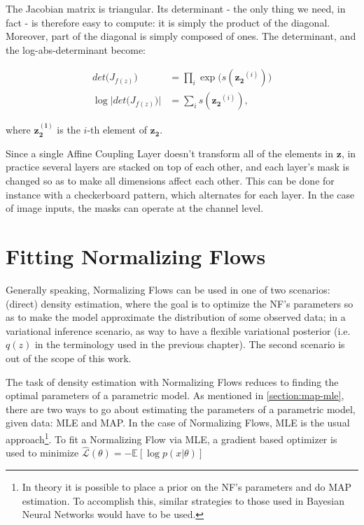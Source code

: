 The Jacobian matrix is triangular. Its determinant - the only thing we need,
in fact - is therefore easy to compute: it is simply the product of the diagonal.
Moreover, part of the diagonal is simply composed of ones. The determinant, and
the log-abs-determinant become:

\begin{align}
    det\big(J_{f(z)}\big) &= \prod_i \exp\big(s(\mathbf{z_2}^{(i)})\big) \\
    \log \Big|det\big(J_{f(z)}\big)\Big| &= \sum_i s(\mathbf{z_2}^{(i)}),
\end{align}

where $\mathbf{z_2^{(i)}}$ is the $i$-th element of $\mathbf{z_2}$.

Since a single Affine Coupling Layer doesn't transform all of the elements in
$\mathbf{z}$, in practice several layers are stacked on top of each other, and
each layer's mask is changed so as to make all dimensions affect each other.
This can be done for instance with a checkerboard pattern, which alternates
for each layer. In the case of image inputs, the masks can operate at the channel
level.

\section{Fitting Normalizing Flows}

Generally speaking, Normalizing Flows can be used in one of two scenarios:
(direct) density estimation, where the goal is to optimize the NF's parameters
so as to make the model approximate the distribution of some observed data;
in a variational inference scenario, as way to have a flexible variational
posterior (i.e. $q(z)$ in the terminology used in the previous chapter). The
second scenario is out of the scope of this work.

The task of density estimation with Normalizing Flows reduces to finding the
optimal parameters of a parametric model. As mentioned in \ref{section:map-mle},
there are two ways to go about estimating the parameters of a parametric model,
given data: MLE and MAP. In the case of Normalizing Flows, MLE is the usual
approach\footnote{In theory it is possible to place a prior on the NF's parameters
and do MAP estimation. To accomplish this, similar strategies to those used in
Bayesian Neural Networks would have to be used.}. To fit a Normalizing Flow via
MLE, a gradient based optimizer is used to minimize
$\hat{\mathcal{L}}(\theta) = - \mathbb{E}[\log p(x|\theta)]$
